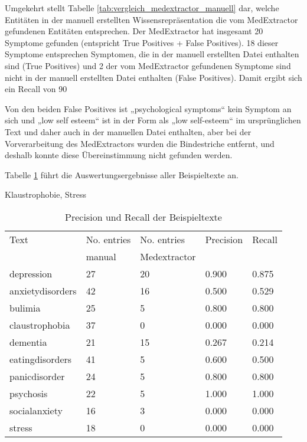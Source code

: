Umgekehrt stellt Tabelle \ref{tab:vergleich_medextractor_manuell} dar, welche Entitäten in der manuell erstellten Wissensrepräsentation die vom MedExtractor gefundenen Entitäten entsprechen. Der MedExtractor hat insgesamt 20 Symptome gefunden (entspricht True Positives + False Positives). 18 dieser Symptome entsprechen Symptomen, die in der manuell erstellten Datei enthalten sind (True Positives) und 2 der vom MedExtractor gefundenen Symptome sind nicht in der manuell erstellten Datei enthalten (False Positives). Damit ergibt sich ein Recall von 90%

Von den beiden False Positives ist „psychological symptoms“ kein Symptom an sich und „low self esteem“ ist in der Form als „low self-esteem“ im ursprünglichen Text und daher auch in der manuellen Datei enthalten, aber bei der Vorverarbeitung des MedExtractors wurden die Bindestriche entfernt, und deshalb konnte diese Übereinstimmung nicht gefunden werden.


Tabelle \ref{tab:precision_recall} führt die Auswertungsergebnisse aller Beispieltexte an. 

Klaustrophobie, Stress

\begin{table}
\begin{center}
\begin{tabular}{lllll}
\toprule
            Text & No. entries        & No. entries              & Precision & Recall \\
                 & manual             &  Medextractor            &           &        \\
\midrule
      depression &                 27 &                       20 &     0.900 &  0.875 \\
anxietydisorders &                 42 &                       16 &     0.500 &  0.529 \\
         bulimia &                 25 &                        5 &     0.800 &  0.800 \\
  claustrophobia &                 37 &                        0 &     0.000 &  0.000 \\
        dementia &                 21 &                       15 &     0.267 &  0.214 \\
 eatingdisorders &                 41 &                        5 &     0.600 &  0.500 \\
   panicdisorder &                 24 &                        5 &     0.800 &  0.800 \\
       psychosis &                 22 &                        5 &     1.000 &  1.000 \\
   socialanxiety &                 16 &                        3 &     0.000 &  0.000 \\
          stress &                 18 &                        0 &     0.000 &  0.000 \\
\bottomrule
\end{tabular}
\caption{Precision und Recall der Beispieltexte}
\label{tab:precision_recall}
\end{center}
\end{table}




